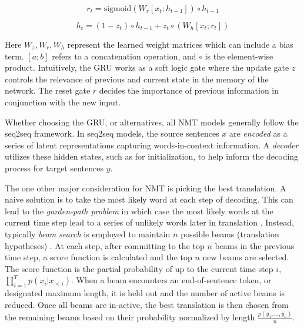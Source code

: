 \begin{equation} 
	r_{t} = \text{sigmoid}(W_{r} [x_{t}; h_{t-1}] )  \circ h_{t-1}%
\end{equation}

\begin{equation}
	h_{t} = (1 - z_{t}) \circ h_{t-1} + z_{t} \circ (W_{h} [x_{t}; r_{t} ]) %
\end{equation}

Here $W_{z}, W_{r}, W_{h}$ represent the learned weight matrices which can include a bias term.  $[a ; b]$ refers to a concatenation operation, and $\circ$ is the element-wise product. Intuitively, the \ac{GRU} works as a soft logic gate where the update gate $z$ controls the relevance of previous and current state in the memory of the network. The reset gate $r$ decides the importance of previous information in conjunction with the new input. 

Whether choosing the \ac{GRU}, or alternatives,  all \ac{NMT} models generally follow the \ac{seq2seq} framework. In seq2seq models, the source sentences $x$ are \textit{encoded} as a series of latent representations capturing words-in-context information. A \textit{decoder} utilizes these hidden states, such as for initialization, to help inform the decoding process for target sentences $y$. 


The one other major consideration for \ac{NMT} is picking the best translation. A naive solution is to take the most likely word at each step of decoding. This can lead to the \textit{garden-path problem} in which case the most likely words at the current time step lead to a series of unlikely words later in translation \cite{koehn2017NMT}. Instead, typically \textit{beam search} is employed to maintain $n$ possible beams (translation hypotheses) \cite{koehn2017NMT}. At each step, after committing to the top $n$ beams  in the previous time step, a score function is calculated and the top $n$ new beams are selected. The score function is the partial probability of up to the current time step $i$, $\prod^{T}_{i=1} p(x_{i} | x_{<i})$. When a beam encounters an end-of-sentence token, or designated maximum length, it is held out and the number of active beams is reduced. Once all beams are in-active, the best translation is then chosen from the remaining beams based on their probability normalized by length $\frac{p(y_{1}, ..., y_{n})}{n}$. 





